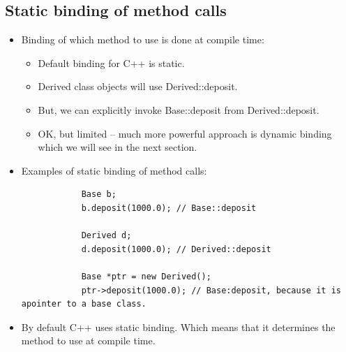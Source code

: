 \subsection{Static binding of method calls}
\begin{itemize}
    \item Binding of which method to use is done at compile time:
        \begin{itemize}
            \item Default binding for C++ is static.
            \item Derived class objects will use Derived::deposit.
            \item But, we can explicitly invoke Base::deposit from Derived::deposit.
            \item OK, but limited -- much more powerful approach is dynamic binding which we will see in the next section.
        \end{itemize}
    
    \item Examples of static binding of method calls:
        \begin{verbatim}
            Base b;
            b.deposit(1000.0); // Base::deposit
            
            Derived d;
            d.deposit(1000.0); // Derived::deposit

            Base *ptr = new Derived();
            ptr->deposit(1000.0); // Base:deposit, because it is apointer to a base class.
        \end{verbatim}
    
    \item By default C++ uses static binding. Which means that it determines the method to use at compile time.
\end{itemize}

